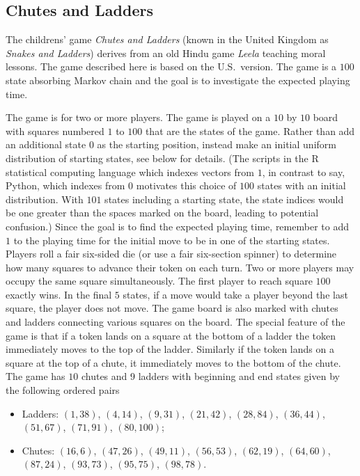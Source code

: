 \documentclass[12pt]{article}
\begin{document}
\subsection*{Chutes and Ladders}

The childrens' game \emph{Chutes and Ladders} (known in the United
Kingdom as \emph{Snakes and Ladders}) derives from an old Hindu game
\emph{Leela} teaching moral lessons.  The game described here is based
on the U.S.\ version.  The game is a \( 100 \) state absorbing Markov
chain and the goal is to investigate the expected playing time.~%

The game is for two or more players.  The game is played on a \( 10 \)
by \( 10 \) board with squares numbered \( 1 \) to \( 100 \) that are
the states of the game.  Rather than add an additional state \( 0 \) as
the starting position, instead make an initial uniform distribution of
starting states, see below for details.  (The scripts in the R
statistical computing language which indexes vectors from \( 1 \), in
contrast to say, Python, which indexes from \( 0 \) motivates this
choice of \( 100 \) states with an initial distribution.  With \( 101 \)
states including a starting state, the state indices would be one
greater than the spaces marked on the board, leading to potential
confusion.) Since the goal is to find the expected playing time,
remember to add \( 1 \) to the playing time for the initial move to be
in one of the starting states.  Players roll a fair six-sided die (or
use a fair six-section spinner) to determine how many squares to advance
their token on each turn.  Two or more players may occupy the same
square simultaneously.  The first player to reach square \( 100 \)
exactly wins.  In the final \( 5 \) states, if a move would take a
player beyond the last square, the player does not move.  The game board
is also marked with chutes and ladders connecting various squares on the
board. The special feature of the game is that if a token lands on a
square at the bottom of a ladder the token immediately moves to the top
of the ladder.  Similarly if the token lands on a square at the top of a
chute, it immediately moves to the bottom of the chute.  The game has \(
10 \) chutes and \( 9 \) ladders with beginning and end states given by
the following ordered pairs
\begin{itemize}
    \item
        Ladders:  \( (1,38) \), \( (4,14) \), \( (9,31) \), \( (21,42) \),
        \( (28,84) \), \( (36, 44) \), \( (51,67) \), \( (71,91) \), \(
        (80, 100) \);
    \item
        Chutes:  \( (16,6) \), \( (47,26) \), \( (49,11) \), \( (56,53) \),
        \( (62,19) \), \( (64,60) \), \( (87,24) \), \( (93,73) \), \( (95,75)
        \), \( (98,78) \).
\end{itemize}
\end{document}
